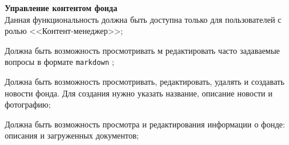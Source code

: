 \begin{subreg}
    \item \textbf{Управление контентом фонда\\}
    Данная функциональность должна быть доступна только для пользователей с ролью <<Контент-менеджер>>;
    
    \begin{subreg}
    \item Должна быть возможность просмотривать м редактировать часто задаваемые вопросы в формате \texttt{markdown} \cite{md};
    \item Должна быть возможность просмотривать, редактировать, удалять и создавать новости фонда. Для создания нужно указать название, описание новости и фотографию;
    \item Должна быть возможность просмотра и редактирования информации о фонде: описания и загруженных документов;
    \end{subreg}
    
\end{subreg}


\renewcommand{\labelenumi}{\arabic{enumi}.}

\renewcommand{\labelenumii}{\arabic{enumii}.}

\renewcommand{\labelenumiii}{\arabic{enumiii}.}




